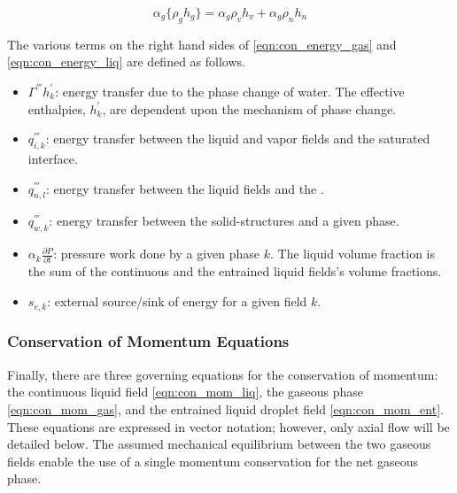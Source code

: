 \begin{equation}
\label{eqn:gaseous_enthalpy}
\alpha_g \{\rho_g h_g\} = \alpha_g \rho_v h_v + \alpha_g \rho_n h_n
\end{equation}

The various terms on the right hand sides of \eqref{eqn:con_energy_gas} and \eqref{eqn:con_energy_liq} are defined as follows.
\begin{itemize}
\item{
$\Gamma^{'''} h^{'}_k$:
 energy transfer due to the phase change of water.
 The effective enthalpies, $h^{'}_k$, are dependent upon the mechanism of phase change.
}
\item{
$q^{'''}_{i,k}$:
energy transfer between the liquid and vapor fields and the saturated interface.
}
\item{
$q^{'''}_{n,l}$:
energy transfer between the liquid fields and the \ncgs{}.
}
\item{
$q^{'''}_{w,k}$:
 energy transfer between the solid-structures and a given phase.
}
\item{
$\alpha_k \frac{\partial P}{\partial t}$:
 pressure work done by a given phase $k$.
 The liquid volume fraction is the sum of the continuous and the entrained liquid fields's volume fractions.
}
\item{
$s_{e,k}$:
 external source/sink of energy for a given field $k$.
}
\end{itemize}

\subsubsection{Conservation of Momentum Equations}
\label{subsubsect:momentum_equations}

Finally, there are three governing equations for the conservation of momentum: the continuous liquid field \eqref{eqn:con_mom_liq}, the gaseous phase \eqref{eqn:con_mom_gas}, and the entrained liquid droplet field \eqref{eqn:con_mom_ent}.
These equations are expressed in vector notation; however, only axial flow will be detailed below.
The assumed mechanical equilibrium between the two gaseous fields enable the use of a single momentum conservation for the net gaseous phase.

